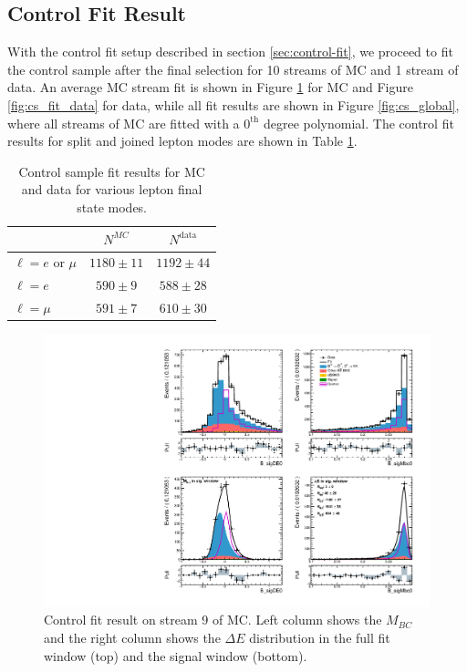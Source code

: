\subsection{Control Fit Result}
With the control fit setup described in section \ref{sec:control-fit}, we proceed to fit the control sample after the final selection for 10 streams of MC and 1 stream of data. An average MC stream fit is shown in Figure \ref{fig:cs_fit_mc} for MC and Figure \ref{fig:cs_fit_data} for data, while all fit results are shown in Figure \ref{fig:cs_global}, where all streams of MC are fitted with a $0^{\mathrm{th}}$ degree polynomial. The control fit results for split and joined lepton modes are shown in Table \ref{tab:cs_fit_yield}.
\begin{table}[H]
	\centering
	\begin{tabular}{l|c|c}
		
		& $N^{MC}$ & $N^{\mathrm{data}}$ \\
		\toprule
		$\ell = e$ or $\mu$ & $1180 \pm 11$ & $1192 \pm 44$\\
		$\ell = e$ & $590 \pm 9$ & $588 \pm 28$ \\
		$\ell = \mu$ & $591 \pm 7$ & $610 \pm 30$\\
		\bottomrule
	\end{tabular}
	\captionsetup{width=0.8\linewidth}
	\caption{Control sample fit results for MC and data for various lepton final state modes.}
	\label{tab:cs_fit_yield}
\end{table}

\begin{figure}[H]
	\centering
	\captionsetup{width=0.8\linewidth}
	\includegraphics[width=\linewidth]{fig/cs_fit_mc}
	\caption{Control fit result on stream 9 of MC. Left column shows the $M_{BC}$ and the right column shows the $\Delta E$ distribution in the full fit window (top) and the signal window (bottom).}
	\label{fig:cs_fit_mc}
\end{figure}


